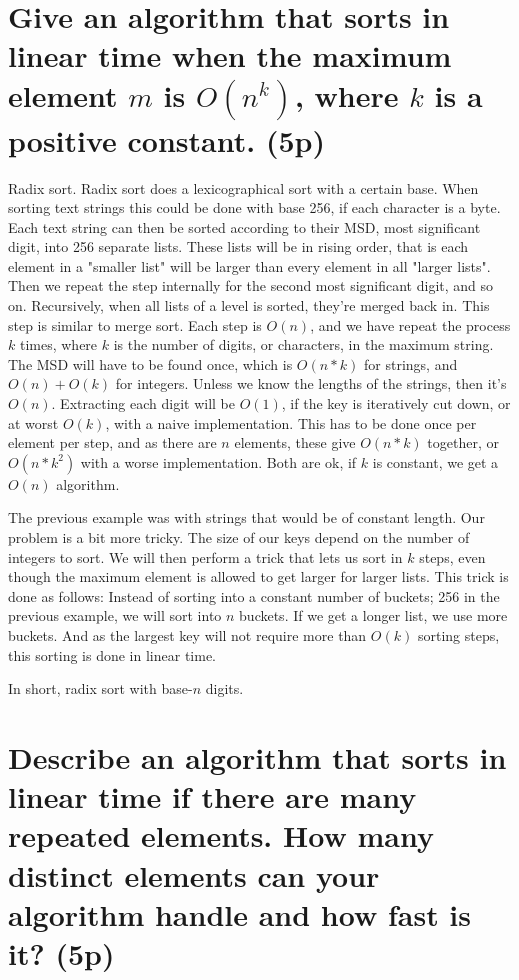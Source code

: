 \documentclass[a4paper,10pt,titlepage]{article}
\begin{document}
\section {Give an algorithm that sorts in linear time when the maximum element $m$ is $O(n^k)$, where $k$ is a positive constant. (5p)}

Radix sort. Radix sort does a lexicographical sort with a certain base. When sorting text strings this could be done with base 256, if each character is a byte. Each text string can then be sorted according to their MSD, most significant digit, into 256 separate lists. These lists will be in rising order, that is each element in a "smaller list" will be larger than every element in all "larger lists". Then we repeat the step internally for the second most significant digit, and so on. Recursively, when all lists of a level is sorted, they're merged back in. This step is similar to merge sort. Each step is $O(n)$, and we have repeat the process $k$ times, where $k$ is the number of digits, or characters, in the maximum string. The MSD will have to be found once, which is $O(n*k)$ for strings, and $O(n)+O(k)$ for integers. Unless we know the lengths of the strings, then it's $O(n)$. Extracting each digit will be $O(1)$, if the key is iteratively cut down, or at worst $O(k)$, with a naive implementation. This has to be done once per element per step, and as there are $n$ elements, these give $O(n*k)$ together, or $O(n*k^2)$ with a worse implementation. Both are ok, if $k$ is constant, we get a $O(n)$ algorithm.

The previous example was with strings that would be of constant length. Our problem is a bit more tricky. The size of our keys depend on the number of integers to sort. We will then perform a trick that lets us sort in $k$ steps, even though the maximum element is allowed to get larger for larger lists. This trick is done as follows: Instead of sorting into a constant number of buckets; 256 in the previous example, we will sort into $n$ buckets. If we get a longer list, we use more buckets. And as the largest key will not require more than $O(k)$ sorting steps, this sorting is done in linear time.

In short, radix sort with base-$n$ digits.

\section {Describe an algorithm that sorts in linear time if there are many repeated elements. How many distinct elements can your algorithm handle and how fast is it? (5p)}
\end{document}
